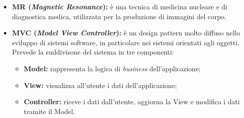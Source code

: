 \begin{itemize}
\item\textbf{MR (\textit{Magnetic Resonance}):} è una tecnica di medicina nucleare e di diagnostica medica, utilizzata per la produzione di immagini del corpo.

\item \textbf{MVC (\textit{Model View Controller}):} è un design pattern\glossario{} molto diffuso nello sviluppo di sistemi software, in particolare nei sistemi orientati agli oggetti. Prevede la suddivisone del sistema in tre componenti: 
\begin{itemize}
\item \textbf{Model:} rappresenta la logica di \emph{business} dell'applicazione;
\item \textbf{View:} visualizza all'utente i dati dell'applicazione;
\item \textbf{Controller:} riceve i dati dall’utente, aggiorna la View e modifica i dati tramite il Model.
\end{itemize}
\end{itemize}
\pagebreak

